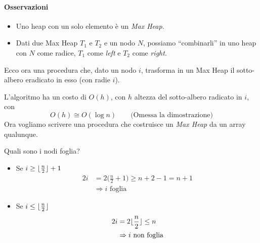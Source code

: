 \paragraph{Osservazioni}
\begin{itemize}[label=$\bullet$]
	\item Uno heap con un solo elemento è un \emph{Max Heap}.
	\item Dati due Max Heap $T_1$ e $T_2$ e un nodo $N$, possiamo ``combinarli'' in uno heap con
	$N$ come radice, $T_1$ come \emph{left} e $T_2$ come \emph{right}.
\end{itemize}

Ecco ora una procedura che, dato un nodo $i$, trasforma in un Max Heap il sotto-albero eradicato in esso (con radie $i$).



L'algoritmo ha un costo di $O(h)$, con $h$ altezza del sotto-albero radicato in $i$, con 
$$O(h) \cong O(\log n) \qquad \text{(Omessa la dimostrazione)}$$
Ora vogliamo scrivere una procedura che costruisce un \emph{Max Heap} da un array qualunque. \par
Quali sono i nodi foglia?
\begin{itemize}
	\item Se $i \geq \lfloor\frac{n}{2}\rfloor + 1$
	\begin{align*}
		2i & = 2\Big( \frac{n}{2} + 1 \Big) \geq n + 2 - 1 = n + 1 \\
		& \Rightarrow i \text{ foglia}
	\end{align*}
	\item Se $i \leq \lfloor\frac{n}{2}\rfloor$
	\begin{align*}
		2i & = 2 \lfloor\frac{n}{2}\rfloor \leq n \\
		& \Rightarrow i \text{ non foglia}
	\end{align*}
\end{itemize}

